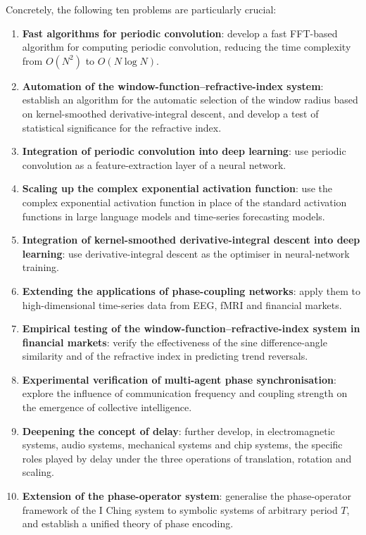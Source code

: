 Concretely, the following ten problems are particularly crucial:

\begin{enumerate}[leftmargin=*]
\rightskip=0pt plus1fil\relax
\item \textbf{Fast algorithms for periodic convolution}: develop a fast FFT-based algorithm for computing periodic convolution, reducing the time complexity from $O(N^2)$ to $O(N\log N)$.

\item \textbf{Automation of the window-function--refractive-index system}: establish an algorithm for the automatic selection of the window radius based on kernel-smoothed derivative-integral descent, and develop a test of statistical significance for the refractive index.

\item \textbf{Integration of periodic convolution into deep learning}: use periodic convolution as a feature-extraction layer of a neural network.

\item \textbf{Scaling up the complex exponential activation function}: use the complex exponential activation function in place of the standard activation functions in large language models and time-series forecasting models.

\item \textbf{Integration of kernel-smoothed derivative-integral descent into deep learning}: use derivative-integral descent as the optimiser in neural-network training.

\item \textbf{Extending the applications of phase-coupling networks}: apply them to high-dimensional time-series data from EEG, fMRI and financial markets.

\item \textbf{Empirical testing of the window-function--refractive-index system in financial markets}: verify the effectiveness of the sine difference-angle similarity and of the refractive index in predicting trend reversals.

\item \textbf{Experimental verification of multi-agent phase synchronisation}: explore the influence of communication frequency and coupling strength on the emergence of collective intelligence.

\item \textbf{Deepening the concept of delay}: further develop, in electromagnetic systems, audio systems, mechanical systems and chip systems, the specific roles played by delay under the three operations of translation, rotation and scaling.

\item \textbf{Extension of the phase-operator system}: generalise the phase-operator framework of the I Ching system to symbolic systems of arbitrary period $T$, and establish a unified theory of phase encoding.
\end{enumerate}

